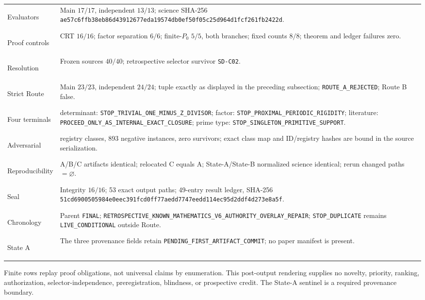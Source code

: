 \setlength{\tabcolsep}{4pt}
\renewcommand{\arraystretch}{1.0}
\noindent\begin{tabularx}{\textwidth}{@{}>{\bfseries\raggedright\arraybackslash}p{}
  >{\raggedright\arraybackslash}X@{}}
Evaluators
  & Main \(17/17\), independent \(13/13\); science SHA-256
    \texttt{ae57c6ffb38eb86d43912677eda19574db0ef50f05c25d964d1fcf261fb2422d}.\\
Proof controls
  & CRT \(16/16\); factor separation \(6/6\); finite-\(P_0\) \(5/5\), both
    branches; fixed counts \(8/8\); theorem and ledger failures zero.\\
Resolution
  & Frozen sources \(40/40\); retrospective selector survivor
    \texttt{SD-C02}.\\
Strict Route
  & Main \(23/23\), independent \(24/24\); tuple exactly as displayed in the
    preceding subsection; \texttt{ROUTE\_A\_REJECTED}; Route B false.\\
Four terminals
  & determinant: \texttt{STOP\_TRIVIAL\_ONE\_MINUS\_Z\_DIVISOR};
    factor: \texttt{STOP\_PROXIMAL\_PERIODIC\_RIGIDITY};
    literature: \texttt{PROCEED\_ONLY\_AS\_INTERNAL\_EXACT\_CLOSURE};
    prime type: \texttt{STOP\_SINGLETON\_PRIMITIVE\_SUPPORT}.\\
Adversarial
  & 62 registry classes, 893 negative instances, zero survivors; exact class
    map and ID/registry hashes are bound in the source serialization.\\
Reproducibility
  & A/B/C artifacts identical; relocated C equals A; State-A/State-B
    normalized science identical; rerun changed paths \(=\varnothing\).\\
Seal
  & Integrity \(16/16\); 53 exact output paths; 49-entry result ledger,
    SHA-256
    \texttt{51cd6900505984e0eec391fcd0ff77aedd7747eedd114ec95d2ddf4d273e8a5f}.\\
Chronology
  & Parent \texttt{FINAL};
    \texttt{RETROSPECTIVE\_KNOWN\_MATHEMATICS\_V6\_AUTHORITY\_OVERLAY\_REPAIR};
    \texttt{STOP\_DUPLICATE} remains \texttt{LIVE\_CONDITIONAL} outside
    Route.\\
State A
  & The three provenance fields retain
    \texttt{PENDING\_FIRST\_ARTIFACT\_COMMIT}; no paper manifest is present.\\
\end{tabularx}
\smallskip

Finite rows replay proof obligations, not universal claims by enumeration.
This post-output rendering supplies no novelty, priority, ranking,
authorization, selector-independence, preregistration, blindness, or
prospective credit.  The State-A sentinel is a required provenance boundary.
\endgroup
